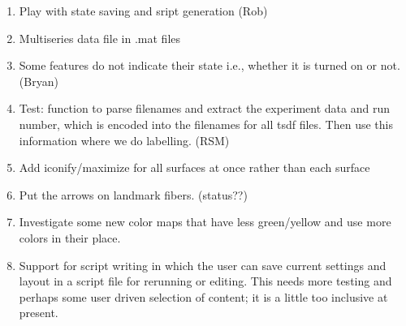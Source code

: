 \documentclass[11pt]{article}
\begin{document}
\begin{enumerate}
  \item Play with state saving and sript generation (Rob)
  \item Multiseries data file in .mat files
  \item Some features do not indicate their state i.e., whether it is
    turned on or not. (Bryan)
  \item Test: function to parse filenames and extract the experiment
    data and run number, which is encoded into the filenames for all tsdf
    files.  Then use this information where we do labelling. (RSM)
  \item Add iconify/maximize for all surfaces at
        once rather than each surface 
  \item Put the arrows on landmark fibers.  (status??)
  \item Investigate some new color maps that have less green/yellow and use
    more colors in their place.
  \item Support for script writing in which the user can save  current
    settings and layout in a script file for rerunning or editing.  This
    needs more testing and perhaps some user driven selection of content;
    it is a little too inclusive at present.


\end{enumerate}
\end{document}
